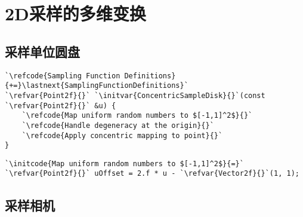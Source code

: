 \section{2D采样的多维变换}\label{sec:2D采样的多维变换}

\subsection{采样单位圆盘}\label{sub:采样单位圆盘}

\begin{lstlisting}
`\refcode{Sampling Function Definitions}{+=}\lastnext{SamplingFunctionDefinitions}`
`\refvar{Point2f}{}` `\initvar{ConcentricSampleDisk}{}`(const `\refvar{Point2f}{}` &u) {
    `\refcode{Map uniform random numbers to $[-1,1]^2$}{}`
    `\refcode{Handle degeneracy at the origin}{}`
    `\refcode{Apply concentric mapping to point}{}`
}
\end{lstlisting}
\begin{lstlisting}
`\initcode{Map uniform random numbers to $[-1,1]^2$}{=}`
`\refvar{Point2f}{}` uOffset = 2.f * u - `\refvar{Vector2f}{}`(1, 1);
\end{lstlisting}
\subsection{采样相机}\label{sub:采样相机1}